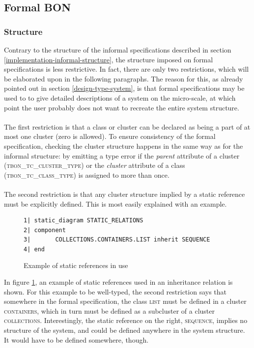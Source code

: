 \subsection{Formal BON}
\subsubsection{Structure}
Contrary to the structure of the informal specifications described in section \ref{implementation-informal-structure}, the structure imposed on formal specifications is less restrictive. In fact, there are only two restrictions, which will be elaborated upon in the following paragraphs. The reason for this, as already pointed out in section \ref{design-type-system}, is that formal specifications may be used to to give detailed descriptions of a system on the micro-scale, at which point the user probably does not want to recreate the entire system structure.
\paragraph{}
The first restriction is that a class or cluster can be declared as being a part of at most one cluster (zero is allowed). To ensure consistency of the formal specification, checking the cluster structure happens in the same way as for the informal structure: by emitting a type error if the \textit{parent} attribute of a cluster (\textsc{tbon\_tc\_cluster\_type}) or the \textit{cluster} attribute of a class (\textsc{tbon\_tc\_class\_type}) is assigned to more than once.
\paragraph{}
The second restriction is that any cluster structure implied by a static reference must be explicitly defined. This is most easily explained with an example.
\begin{figure}[H]
{\footnotesize
\begin{verbatim}
1| static_diagram STATIC_RELATIONS
2| component
3|       COLLECTIONS.CONTAINERS.LIST inherit SEQUENCE
4| end
\end{verbatim}
}
\caption{Example of static references in use}
\label{fig:structure_static_references}
\end{figure}
In figure \ref{fig:structure_static_references}, an example of static references used in an inheritance relation is shown. For this example to be well-typed, the second restriction says that somewhere in the formal specification, the class \textsc{list} must be defined in a cluster \textsc{containers}, which in turn must be defined as a subcluster of a cluster \textsc{collections}. Interestingly, the static reference on the right, \textsc{sequence}, implies no structure of the system, and could be defined anywhere in the system structure. It would have to be defined somewhere, though.
